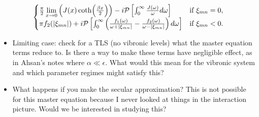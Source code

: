 \documentclass[]{article}
\begin{document}
\begin{itemize}
\begin{itemize}
\begin{equation}
\begin{cases}
\frac{\pi}{2}\lim\limits_{x\to 0}\left(J(x)\coth(\frac{\beta x}{2})\right) - i\mathcal{P}\left[\int_{0}^{\infty}\frac{J(\omega)}{\omega}d\omega\right] & \text{if } \xi_{mn}=0,\\ 
\pi f_2(\abs{\xi_{mn}}) + i\mathcal{P}\left[\int_{0}^{\infty}\left(\frac{f_1(\omega)}{\omega+\abs{\xi_{mn}}} - \frac{f_2(\omega)}{\omega-\abs{\xi_{mn}}}\right)d\omega\right]  & \text{if } \xi_{mn}<0.
\end{cases}
\end{equation}
\begin{itemize}
	\item Limiting case: check for a TLS (no vibronic levels) what the master equation terms reduce to. Is there a way to make these terms have negligible effect, as in Ahsan's notes where $\alpha\ll \epsilon$. What would this mean for the vibronic system and which parameter regimes might satisfy this?
	\item What happens if you make the secular approximation? This is not possible for this master equation because I never looked at things in the interaction picture. Would we be interested in studying this?
\end{itemize}

\end{itemize}
\end{itemize}
\end{document}
